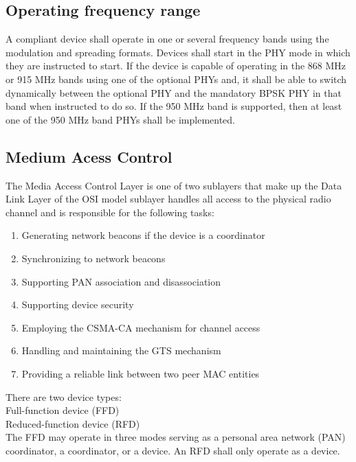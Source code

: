 \subsection{Operating frequency range}
A compliant device shall operate in one or several frequency bands using the modulation and spreading formats. Devices shall start in the PHY mode in which they are instructed to start. If the device is capable of operating in the 868 MHz or 915 MHz bands using one of the optional PHYs and, it shall be able to switch dynamically between the optional PHY and the mandatory BPSK PHY in that band when instructed to do so. If the 950 MHz band is supported, then at least one of the 950 MHz band PHYs shall be implemented.
\subsection{Medium Acess Control}
The Media Access Control Layer is one of two sublayers that make up the Data Link Layer of the OSI model sublayer handles all access to the physical radio channel and is responsible for the following tasks:
\begin{enumerate}
	\item{Generating network beacons if the device is a coordinator}
	\item{Synchronizing to network beacons}
	\item{Supporting PAN association and disassociation}
	\item{Supporting device security}
	\item{Employing the CSMA-CA mechanism for channel access}
	\item{Handling and maintaining the GTS mechanism}
	\item{Providing a reliable link between two peer MAC entities}
\end{enumerate}
There are two device types:\\ 
Full-function device (FFD)\\ 
Reduced-function device (RFD)\\ 
The FFD may operate in three modes serving as a personal area network (PAN) coordinator, a coordinator, or a device. An RFD shall only operate as a device.
